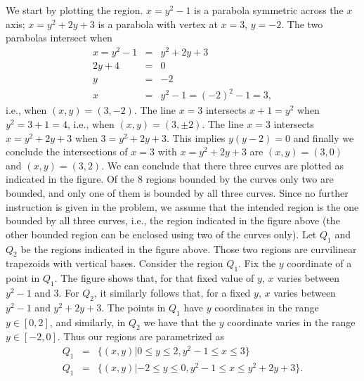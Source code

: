 {We start by plotting the region. $ x=y^2-1$ is a parabola symmetric across the $x$ axis; $x=y^2+2y+3$ is a parabola with vertex at $x=3$, $y=-2$. The two parabolas intersect when 
\[
\begin{array}{rcl}
x=y^2-1&=& y^2+2y+3\\
2y+4&=&0\\
y&=&-2\\
x&=&y^2-1=(-2)^2-1=3,
\end{array}
\]
i.e., when $(x,y)=(3, -2)$. The line $x=3$ intersects $x+1=y^2$ when $y^2= 3+1 = 4$, i.e., when $(x,y)=(3,\pm 2)$. The line $x=3$ intersects $x=y^2+2y+3$ when $3= y^2+2y+3$. This implies $y(y-2)=0$ and finally we conclude the intersections of $x=3$ with $x=y^2+2y+3$ are $(x,y)=(3,0)$ and $(x,y)= (3,2)$. We can conclude that there three curves are plotted as indicated in the figure. Of the 8 regions bounded by the curves only two are bounded, and only one of them is bounded by all three curves. Since no further instruction is given in the problem, we assume that the intended region is the one bounded by all three curves, i.e., the region indicated in the figure above (the other bounded region can be enclosed using two of the curves only). Let $Q_1$ and $Q_2$ be the regions indicated in the figure above. Those two regions are curvilinear trapezoids with vertical bases. Consider the region $ Q_1$. Fix the $y$ coordinate of a point in $Q_1$. The figure shows that, for that fixed value of $y$, $x$ varies between $y^2-1$ and $3$. For $Q_2$, it similarly follows that, for a fixed $y$, $x$ varies between $y^2-1$ and $y^2+2y+3$. The points in $Q_1$ have $y$ coordinates in the range $y\in [ 0 , 2 ] $, and similarly, in $Q_2$ we have that the $y$ coordinate varies in the range $y\in [ -2 , 0 ] $. Thus our regions are parametrized as
\[
\begin{array}{rcl}
Q_1&=&\{(x,y)| 0\leq y\leq 2, y^2-1\leq x\leq 3 \}\\
Q_1&=&\{(x,y)| -2\leq y\leq 0, y^2-1\leq x\leq y^2+2y+3 \}.\\
\end{array}
\]

}
